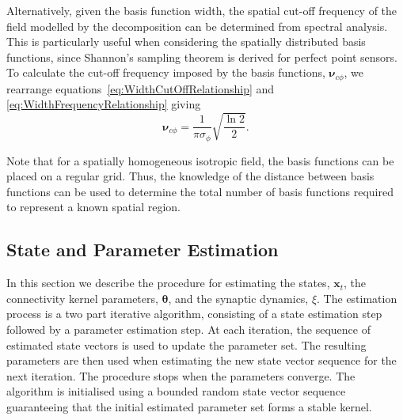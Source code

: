 \documentclass[10pt]{article}
\begin{document}
Alternatively, given the basis function width, the spatial cut-off frequency of the field modelled by the decomposition can be determined from spectral analysis. This is particularly useful when considering the spatially distributed basis functions, since Shannon's sampling theorem is derived for perfect point sensors. To calculate the cut-off frequency imposed by the basis functions, $\boldsymbol{\nu}_{c\phi}$, we rearrange equations~\ref{eq:WidthCutOffRelationship} and \ref{eq:WidthFrequencyRelationship} giving
\begin{equation}\label{eq:CutoffFromBasisFuncWidth}
	\boldsymbol{\nu}_{c\phi}=\frac{1}{\pi\sigma_{\phi}}\sqrt{\frac{\ln2}{2}}.
\end{equation} 

Note that for a spatially homogeneous isotropic field, the basis functions can be placed on a regular grid. Thus, the knowledge of the distance between basis functions can be used to determine the total number of basis functions required to represent a known spatial region.

\subsection{State and Parameter Estimation}\label{StateAndParameterEstimationSection} In this section we describe the procedure for estimating the states, $\mathbf{x}_t$, the connectivity kernel parameters, $\boldsymbol \theta$, and the synaptic dynamics, $\xi$. The estimation process is a two part iterative algorithm, consisting of a state estimation step followed by a parameter estimation step. At each iteration, the sequence of estimated state vectors is used to update the parameter set. The resulting parameters are then used when estimating the new state vector sequence for the next iteration. The procedure stops when the parameters converge. The algorithm is initialised using a bounded random state vector sequence guaranteeing that the initial estimated parameter set forms a stable kernel.
\end{document}
